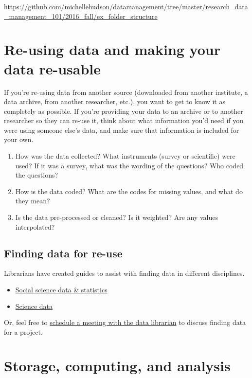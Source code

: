 \url{https://github.com/michellehudson/datamanagement/tree/master/research_data_management_101/2016_fall/ex_folder_structure}

\section{Re-using data and making your data
re-usable}\label{re-using-data-and-making-your-data-re-usable}

If you're re-using data from another source (downloaded from another
institute, a data archive, from another researcher, etc.), you want to
get to know it as completely as possible. If you're providing your data
to an archive or to another researcher so they can re-use it, think
about what information you'd need if you were using someone else's data,
and make sure that information is included for your own.

\begin{enumerate}
\def\labelenumi{\arabic{enumi}.}
\tightlist
\item
  How was the data collected? What instruments (survey or scientific)
  were used? If it was a survey, what was the wording of the questions?
  Who coded the questions?
\item
  How is the data coded? What are the codes for missing values, and what
  do they mean?
\item
  Is the data pre-processed or cleaned? Is it weighted? Are any values
  interpolated?
\end{enumerate}

\subsection{Finding data for re-use}\label{finding-data-for-re-use}

Librarians have created guides to assist with finding data in different
disciplines.

\begin{itemize}
\tightlist
\item
  \href{http://guides.library.yale.edu/data-statistics}{Social science
  data \& statistics}
\item
  \href{http://guides.library.yale.edu/sciencedata}{Science data}
\end{itemize}

Or, feel free to \href{http://bit.ly/meetmichellehudson}{schedule a
meeting with the data librarian} to discuss finding data for a project.

\section{Storage, computing, and
analysis}\label{storage-computing-and-analysis}

